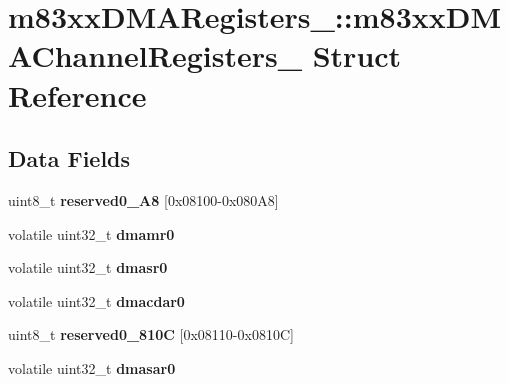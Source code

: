 \hypertarget{structm83xxDMARegisters___1_1m83xxDMAChannelRegisters__}{}\section{m83xx\+D\+M\+A\+Registers\+\_\+\+::m83xx\+D\+M\+A\+Channel\+Registers\+\_\+ Struct Reference}
\label{structm83xxDMARegisters___1_1m83xxDMAChannelRegisters__}
\subsection*{Data Fields}
\begin{DoxyCompactItemize}
\item 
\mbox{\label{structm83xxDMARegisters___1_1m83xxDMAChannelRegisters___ac22ffb34c52693c7163398ebd9a4f8ef}} 
uint8\+\_\+t {\bfseries reserved0\+\_\+A8} \mbox{[}0x08100-\/0x080\+A8\mbox{]}
\item 
\mbox{\label{structm83xxDMARegisters___1_1m83xxDMAChannelRegisters___a8a4a28014fb4f1efca334aebbbc2b091}} 
volatile uint32\+\_\+t {\bfseries dmamr0}
\item 
\mbox{\label{structm83xxDMARegisters___1_1m83xxDMAChannelRegisters___af3fe695ae600204b65325a9e88d081ab}} 
volatile uint32\+\_\+t {\bfseries dmasr0}
\item 
\mbox{\label{structm83xxDMARegisters___1_1m83xxDMAChannelRegisters___ab3c9bd2c6c5fa498b4e69ba806756ce1}} 
volatile uint32\+\_\+t {\bfseries dmacdar0}
\item 
\mbox{\label{structm83xxDMARegisters___1_1m83xxDMAChannelRegisters___a586da0dac379babb3e01eaf079c22bd7}} 
uint8\+\_\+t {\bfseries reserved0\+\_\+810C} \mbox{[}0x08110-\/0x0810\+C\mbox{]}
\item 
\mbox{\label{structm83xxDMARegisters___1_1m83xxDMAChannelRegisters___ad7680b165c3d8bc200b4733c3accbe17}} 
volatile uint32\+\_\+t {\bfseries dmasar0}

\end{DoxyCompactItemize}
